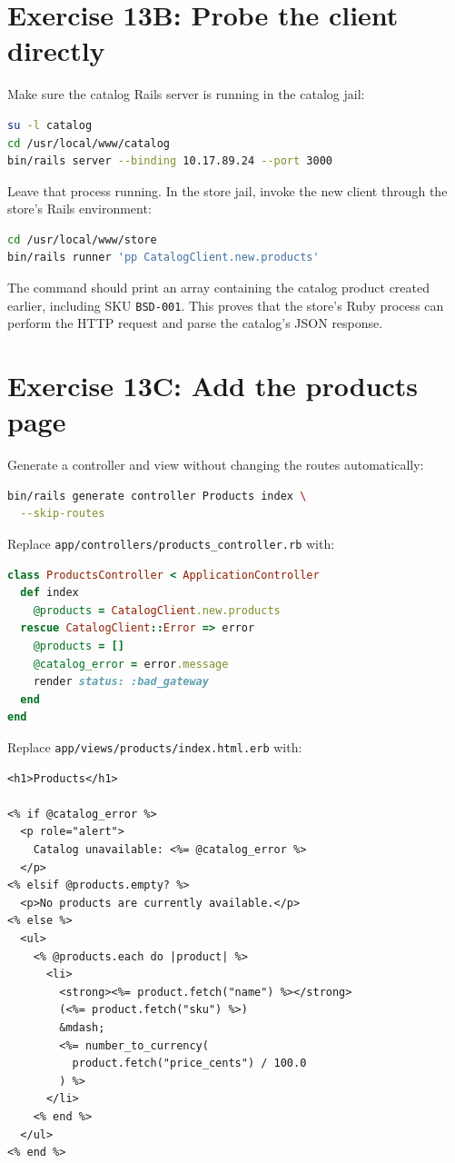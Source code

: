\section{Exercise 13B: Probe the client directly}

Make sure the catalog Rails server is running in the catalog jail:

\begin{lstlisting}[language=sh]
su -l catalog
cd /usr/local/www/catalog
bin/rails server --binding 10.17.89.24 --port 3000
\end{lstlisting}

Leave that process running. In the store jail, invoke the new client through
the store's Rails environment:

\begin{lstlisting}[language=sh]
cd /usr/local/www/store
bin/rails runner 'pp CatalogClient.new.products'
\end{lstlisting}

The command should print an array containing the catalog product created
earlier, including SKU \texttt{BSD-001}. This proves that the store's Ruby
process can perform the HTTP request and parse the catalog's JSON response.

\section{Exercise 13C: Add the products page}

Generate a controller and view without changing the routes automatically:

\begin{lstlisting}[language=sh]
bin/rails generate controller Products index \
  --skip-routes
\end{lstlisting}

Replace \texttt{app/controllers/products\_controller.rb} with:

\begin{lstlisting}[language=Ruby]
class ProductsController < ApplicationController
  def index
    @products = CatalogClient.new.products
  rescue CatalogClient::Error => error
    @products = []
    @catalog_error = error.message
    render status: :bad_gateway
  end
end
\end{lstlisting}

Replace \texttt{app/views/products/index.html.erb} with:

\begin{lstlisting}
<h1>Products</h1>

<% if @catalog_error %>
  <p role="alert">
    Catalog unavailable: <%= @catalog_error %>
  </p>
<% elsif @products.empty? %>
  <p>No products are currently available.</p>
<% else %>
  <ul>
    <% @products.each do |product| %>
      <li>
        <strong><%= product.fetch("name") %></strong>
        (<%= product.fetch("sku") %>)
        &mdash;
        <%= number_to_currency(
          product.fetch("price_cents") / 100.0
        ) %>
      </li>
    <% end %>
  </ul>
<% end %>
\end{lstlisting}

